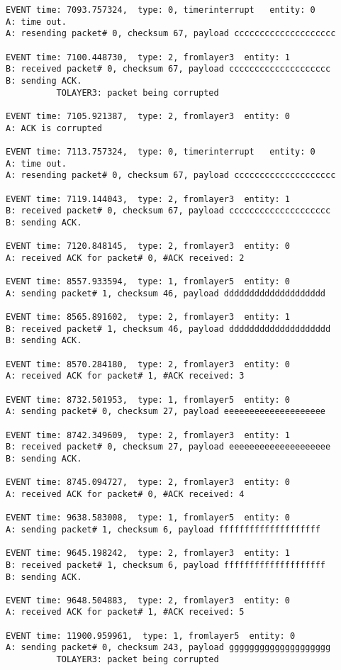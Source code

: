 \documentclass[12pt]{article}
\begin{document}
\begin{Verbatim}[frame=single, rulecolor=\color{cyan}, label=10 messages ACKed correctly]
EVENT time: 7093.757324,  type: 0, timerinterrupt   entity: 0
A: time out. 
A: resending packet# 0, checksum 67, payload cccccccccccccccccccc

EVENT time: 7100.448730,  type: 2, fromlayer3  entity: 1
B: received packet# 0, checksum 67, payload cccccccccccccccccccc
B: sending ACK.
          TOLAYER3: packet being corrupted

EVENT time: 7105.921387,  type: 2, fromlayer3  entity: 0
A: ACK is corrupted

EVENT time: 7113.757324,  type: 0, timerinterrupt   entity: 0
A: time out. 
A: resending packet# 0, checksum 67, payload cccccccccccccccccccc     

EVENT time: 7119.144043,  type: 2, fromlayer3  entity: 1
B: received packet# 0, checksum 67, payload cccccccccccccccccccc
B: sending ACK.

EVENT time: 7120.848145,  type: 2, fromlayer3  entity: 0
A: received ACK for packet# 0, #ACK received: 2

EVENT time: 8557.933594,  type: 1, fromlayer5  entity: 0
A: sending packet# 1, checksum 46, payload dddddddddddddddddddd  

EVENT time: 8565.891602,  type: 2, fromlayer3  entity: 1
B: received packet# 1, checksum 46, payload dddddddddddddddddddd
B: sending ACK.

EVENT time: 8570.284180,  type: 2, fromlayer3  entity: 0
A: received ACK for packet# 1, #ACK received: 3

EVENT time: 8732.501953,  type: 1, fromlayer5  entity: 0
A: sending packet# 0, checksum 27, payload eeeeeeeeeeeeeeeeeeee  

EVENT time: 8742.349609,  type: 2, fromlayer3  entity: 1
B: received packet# 0, checksum 27, payload eeeeeeeeeeeeeeeeeeee
B: sending ACK.

EVENT time: 8745.094727,  type: 2, fromlayer3  entity: 0
A: received ACK for packet# 0, #ACK received: 4

EVENT time: 9638.583008,  type: 1, fromlayer5  entity: 0
A: sending packet# 1, checksum 6, payload ffffffffffffffffffff   

EVENT time: 9645.198242,  type: 2, fromlayer3  entity: 1
B: received packet# 1, checksum 6, payload ffffffffffffffffffff
B: sending ACK.

EVENT time: 9648.504883,  type: 2, fromlayer3  entity: 0
A: received ACK for packet# 1, #ACK received: 5

EVENT time: 11900.959961,  type: 1, fromlayer5  entity: 0
A: sending packet# 0, checksum 243, payload gggggggggggggggggggg 
          TOLAYER3: packet being corrupted


\end{Verbatim}
\end{document}
